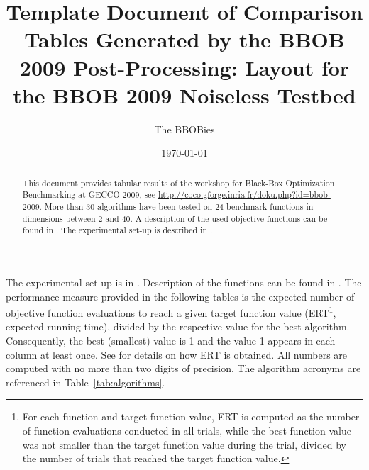 \documentclass[a4paper,10pt]{article}
\title{Template Document of Comparison Tables Generated by the BBOB 2009
Post-Processing: Layout for the BBOB 2009 Noiseless Testbed}
\author{The BBOBies}
\date{\today}
\begin{document}
\maketitle

\begin{abstract}
This document provides tabular results of the workshop for Black-Box Optimization Benchmarking at GECCO 2009, see \url{http://coco.gforge.inria.fr/doku.php?id=bbob-2009}. More than 30 algorithms have been tested on 24 benchmark functions in dimensions between 2 and 40. A description of the used objective functions can be found in \cite{hansen2009fun, wp200901}. The experimental set-up is described in \cite{hansen2009exp}.
\end{abstract}

The experimental set-up is in \cite{hansen2009exp}. Description of the functions can be found in \cite{hansen2009fun, wp200901}.
The performance measure provided in the following tables is the expected number of objective function evaluations to reach a given target function value (ERT\footnote{For each function and target function value, ERT is computed as the number of function evaluations conducted in all trials, while the best function value was not smaller than the target function value during the trial, divided by the number of trials that reached the target function value.}, expected running time), divided by the respective value for the best algorithm. Consequently, the best (smallest) value is 1 and the value 1 appears in each column at least once. See \cite{hansen2009exp} for details on how ERT is obtained. All numbers are computed with no more than two digits of precision. The algorithm acronyms are referenced in Table~\ref{tab:algorithms}.
\end{document}
